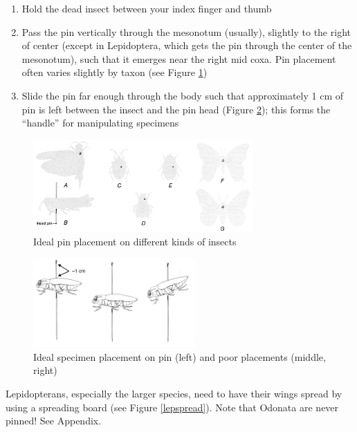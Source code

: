 \documentclass[letterpaper, 11pt]{article}
\begin{document}
\begin{enumerate}
\item Hold the dead insect between your index finger and thumb
\item Pass the pin vertically through the mesonotum (usually), slightly to the right of center (except in Lepidoptera, which gets the pin through the center of the mesonotum), such that it emerges near the right mid coxa.  Pin placement often varies slightly by taxon (see Figure \ref{pinthorax})
\item Slide the pin far enough through the body such that approximately 1 cm of pin is left between the insect and the pin head (Figure \ref{pinplace}); this forms the ``handle'' for manipulating specimens
\end{enumerate}

\begin{figure}[ht!]
	\centering
  \includegraphics[width=0.75\textwidth]{PinsThorax}
  \caption{Ideal pin placement on different kinds of insects \citep[modified from][Fig. 17]{USDAmanual1986}}
  \label{pinthorax}
\end{figure}

\begin{figure}[ht!]
	\centering
  \includegraphics[width=0.55\textwidth]{PinPlacement}
  \caption{Ideal specimen placement on pin (left) and poor placements (middle, right) \citep[modified from][Fig. 16]{USDAmanual1986}}
  \label{pinplace}
\end{figure}

\noindent{}Lepidopterans, especially the larger species, need to have their wings spread by using a spreading board (see Figure \ref{lepspread}). Note that Odonata are never pinned! See Appendix.
\end{document}
